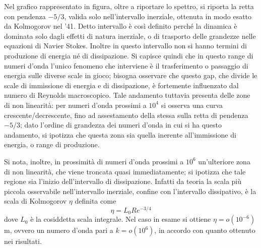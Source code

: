 \documentclass{article} %
\begin{document}
Nel grafico rappresentato in figura, oltre a riportare lo spettro, si riporta la retta con pendenza $-5/3$, valida solo nell'intervallo inerziale, ottenuta in modo esatto da Kolmogorov nel '41. Detto intervallo è così definito perché la dinamica è dominata solo dagli effetti di natura inerziale, o di trasporto delle grandezze nelle equazioni di Navier Stokes. Inoltre in questo intervallo non si hanno termini di produzione di energia né di dissipazione. Si capisce quindi che in questo range di numeri d'onda l'unico fenomeno che interviene è il trasferimento o passaggio di energia sulle diverse scale in gioco; bisogna osservare che questo gap, che divide le scale di immissione di energia e di dissipazione, è fortemente influenzato dal numero di Reynolds macroscopico. Tale andamento tuttavia presenta delle zone di non linearità: per numeri d'onda prossimi a $10^{4}$ si osserva una curva crescente/decrescente, fino ad assestamento della stessa sulla retta di pendenza $-5/3$; dato l'ordine di grandezza dei numeri d'onda in cui si ha questo andamento, si ipotizza che questa zona sia quella inerente all'immissione di energia, o range di produzione.\par
Si nota, inoltre, in prossimità di numeri d'onda prossimi a $10^{6}$ un'ulteriore zona di non linearità, che viene troncata quasi immediatamente; si ipotizza che tale regione sia l'inizio dell'intervallo di dissipazione. Infatti da teoria la scala più piccola osservabile nell'intervallo inerziale, confine con l'intervallo dissipativo, è la scala di Kolmogorov $\eta$ definita come
$$\eta=L_{0} Re^{-3/4}$$
dove $L_{0}$ è la cosiddetta scala integrale. Nel caso in esame si ottiene $\eta=o(10^{-6})$ m, ovvero un numero d'onda pari a $k = o(10^{6})$, in accordo con quanto ottenuto nei risultati.
\end{document}
